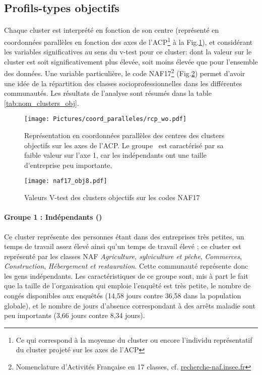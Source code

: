 \documentclass[11pt,fleqn,openany,frenchb]{book} %
\begin{document}
 
\subsection{Profils-types objectifs}
\paragraph{}
Chaque cluster est interprété en fonction de son centre (représenté en coordonnées parallèles en fonction des  axes de l'ACP\footnote{Ce qui correspond à la moyenne du cluster ou encore l'individu représentatif du cluster projeté sur les axes de l'ACP} à la  Fig.\ref{fig:CPobj}), et considérant les variables significatives au sens du v-test pour ce cluster: dont la valeur sur le cluster est soit significativement plus élevée, soit moins élevée que pour l'ensemble des données. Une variable particulière, le code NAF17\footnote{Nomenclature d'Activités Française en 17 classes, cf. \href{http://recherche-naf.insee.fr/SIRENET_Template/Accueil/template_page_accueil.html}{recherche-naf.insee.fr}} (Fig.\ref{fig:nafobj}) permet d'avoir une idée de la répartition des classes socioprofessionnelles dans les différentes communautés. Les résultats de l'analyse sont résumés dans la table \ref{tab:nom_clusters_obj}.


\begin{figure}[!h]
\centering
  \texttt{[image: Pictures/coord\_paralleles/rcp\_wo.pdf]}
\caption{Représentation en coordonnées parallèles des centres des clusters objectifs sur les axes de l'ACP. Le groupe \INDEP\ est caractérisé par sa faible valeur sur l'axe 1, car les indépendants ont une taille d'entreprise peu importante.}
\label{fig:CPobj}
\end{figure}

\begin{figure}[!h]
\centering
  \texttt{[image: naf17\_obj8.pdf]}
\caption{Valeurs V-test des clusters objectifs sur les codes NAF17}
\label{fig:nafobj}
\end{figure}

\paragraph{Groupe 1 : Indépendants (\INDEP)\\}
Ce cluster représente des personnes étant dans des entreprises très petites, un temps de travail assez élevé ainsi qu'un temps de travail élevé ; ce cluster est représenté par les classes NAF \textit{Agriculture, sylviculture et pêche}, \textit{Commerces}, \textit{Construction}, \textit{Hébergement et restauration}. Cette communauté représente donc les gens indépendants. Les caractéristiques de ce groupe sont, mis à part le fait que la taille de l'organisation qui emploie l'enquêté est très petite, le nombre de congés disponibles aux enquêtés (14,58 jours contre 36,58 dans la population globale), et le nombre de jours d'absence correspondant à des arrêts maladie sont peu importants (3,66 jours contre 8,34 jours).
\end{document}
